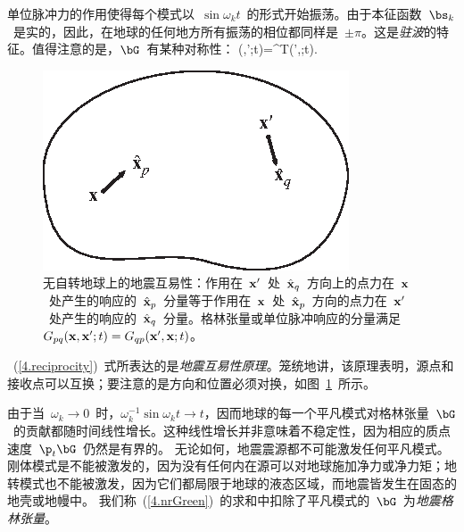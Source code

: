 单位脉冲力的作用使得每个模式以~$\sin\omega_kt$~的形式开始振荡。由于本征函数~$\bs_k$~是实的，因此，在地球的任何地方所有振荡的相位都同样是~$\pm\pi$。这是{\em 驻波}的特征。值得注意的是，$\bG$~有某种对称性：
%
\eq
\label{4.reciprocity}
\bG(\bx,\bx';t)=\bG^{\rm T}(\bx',\bx;t).
\en
\begin{figure}
\begin{center}
\includegraphics{../figures/chap04/fig01.eps}
\end{center}
\caption[seismorep]{\label{fig4.1}
无自转地球上的地震互易性：作用在~${\bf x}^{\prime}$~处~$\hat{\bf x}_q$~方向上的点力在~$\bf x$~处产生的响应的~$\hat{\bf x}_p$~分量等于作用在~$\bf x$~处~$\hat{\bf x}_p$~方向的点力在~${\bf x}^{\prime}$~处产生的响应的~$\hat{\bf x}_q$~分量。格林张量或单位脉冲响应的分量满足~$G_{pq}({\bf x},{\bf x}^{\prime};t)=G_{qp}
({\bf x}^{\prime},{\bf x};t)$。}
\end{figure}
~(\ref{4.reciprocity})~式所表达的是{\em 地震互易性原理}。笼统地讲，该原理表明，源点和接收点可以互换；要注意的是方向和位置必须对换，如图~\ref{fig4.1}~所示。

由于当~$\omega_k\rightarrow 0$~时，$\omega_k^{-1}\sin\omega_kt\rightarrow t$，因而地球的每一个平凡模式对格林张量~$\bG$~的贡献都随时间线性增长。这种线性增长并非意味着不稳定性，因为相应的质点速度~$\p_t\bG$~仍然是有界的。
无论如何，地震震源都不可能激发任何平凡模式。
%
%
刚体模式是不能被激发的，因为没有任何内在源可以对地球施加净力或净力矩；地转模式也不能被激发，因为它们都局限于地球的液态区域，而地震皆发生在固态的地壳或地幔中。
%
%
%
%
%
我们称~(\ref{4.nrGreen})~的求和中扣除了平凡模式的~$\bG$~为{\em 地震格林张量}。
%
%
%
%

